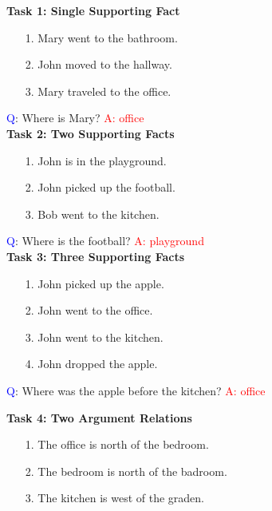 \documentclass{article}
\begin{document}
\textbf{Task 1: Single Supporting Fact}

\begin{itemize}

	\item[1.] Mary went to the bathroom.
	\item[2.] John moved to the hallway.
	\item[3.] Mary traveled to the office.

\end{itemize}

\textcolor{blue}{Q}: Where is Mary?
\textcolor{red}{A: office} \\

\textbf{Task 2: Two Supporting Facts}

\begin{itemize}

	\item[1.] John is in the playground.
	\item[2.] John picked up the football.
	\item[3.] Bob went to the kitchen.

\end{itemize}

\textcolor{blue}{Q}: Where is the football?
\textcolor{red}{A: playground} \\

\textbf{Task 3: Three Supporting Facts}

\begin{itemize}

	\item[1.] John picked up the apple.
	\item[2.] John went to the office.
	\item[3.] John went to the kitchen.
	\item[4.] John dropped the apple.

\end{itemize}

\textcolor{blue}{Q}: Where was the apple before the kitchen?
\textcolor{red}{A: office}\\

\pagebreak

\textbf{Task 4: Two Argument Relations}

\begin{itemize}

	\item[1.] The office is north of the bedroom.
	\item[2.] The bedroom is north of the badroom.
	\item[3.] The kitchen is west of the graden.

\end{itemize}
\end{document}
